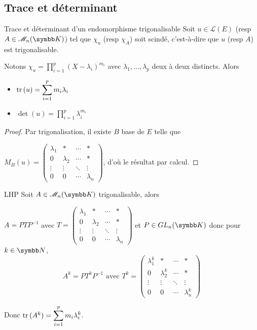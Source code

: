 \subsection{Trace et déterminant }

\begin{proposition}{Trace et déterminant d'un endomorphisme trigonalisable}{}
    Soit $u \in \mathscr L(E)$ (resp $A \in \mathscr M_n(\K)$) tel que $\chi_u$ (resp $\chi_A$) soit scindé, 
    c'est-à-dire que $u$ (resp $A$) est trigonalisable.

    Notons $\displaystyle \chi_u = \prod_{i = 1 }^{ p } (X - \lambda_i)^{m_i}$ avec $\lambda_1, \ldots, \lambda_p$ 
    deux à deux distincts. Alors 
    \begin{itemize}
        \item $\operatorname{tr} \,(u) = \displaystyle \sum_{i = 1 }^{ p } m_i \lambda_i$
        \item $\det(u) = \displaystyle \prod_{i = 1 }^{ p } \lambda_i^{m_i}$
    \end{itemize}
\end{proposition}

\begin{proof}
    Par trigonalisation, il existe $B$ base de $E$ telle que 

    $M_B(u) = \begin{pmatrix}
        \lambda_1 & * & \cdots & * \\
        0 & \lambda_2 & \cdots & * \\
        \vdots & \vdots & \ddots & \vdots \\
        0 & 0 & \cdots & \lambda_n
    \end{pmatrix}$, d'où le résultat par calcul. 
\end{proof}

\begin{corollaire}{LHP}{}
    Soit $A \in \mathscr M_n(\K)$ trigonalisable, alors 

    $A = PTP^{-1}$ avec $T = \begin{pmatrix}
        \lambda_1 & * & \cdots & * \\
        0 & \lambda_2 & \cdots & * \\
        \vdots & \vdots & \ddots & \vdots \\
        0 & 0 & \cdots & \lambda_n
    \end{pmatrix}$ et $P \in GL_n(\K)$
    donc pour $k \in \N$, 
    $$A^k = P T^k P^{-1} \text{ avec } T^k = \begin{pmatrix}
        \lambda_1^k & * & \cdots & * \\
        0 & \lambda_2^k & \cdots & * \\
        \vdots & \vdots & \ddots & \vdots \\
        0 & 0 & \cdots & \lambda_n^k
    \end{pmatrix}$$

    Donc $\operatorname{tr} \,(A^k) = \displaystyle \sum_{i = 1 }^{ p } m_i\lambda_i^k$.
\end{corollaire}

